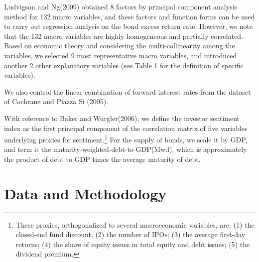 \documentclass[12pt]{article}
\begin{document}
Ludvigson and Ng(2009)\cite{ludvigson2009macro} obtained 8 factors by principal component analysis method for 132 macro variables, and these factors and function forms can be used to carry out regression analysis on the bond excess return rate. However, we note that the 132 macro variables are highly homogeneous and partially correlated. Based on economic theory and considering the multi-collinearity among the variables, we selected 9 most representative macro variables, and introduced another 2 other explanatory variables (see Table 1 for the definition of specific variables). 

We also control the linear combination of forward interest rates from the dataset of Cochrane and Piazza Si (2005)\cite{cochrane2005bond}.

With reference to Baker and Wurgler(2006)\cite{baker2006investor}, we define the investor sentiment index as the first principal component of the correlation matrix of five variables underlying proxies for sentiment.\footnote{These proxies, orthogonalized to several macroeconomic variables, are: (1) the closed-end fund discount;  (2) the number of IPOs; (3) the average first-day returns; (4) the share of equity issues in total equity and debt issues; (5) the dividend premium.} For the supply of bonds, we scale it by GDP, and term it the maturity-weighted-debt-to-GDP(Mwd), which is approximately the product of debt to GDP times the average maturity of debt.

\section{Data and Methodology}
\end{document}
